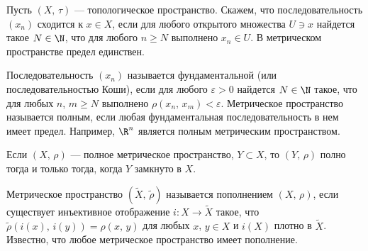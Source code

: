 \documentclass[a4paper
]{article}
\begin{document}
Пусть $(X, \, \tau)$ --- топологическое пространство. Скажем, что
последовательность $(x_n)$ сходится к $x\in X$, если для любого
открытого множества $U\ni x$ найдется такое $N\in \N$, что для любого
$n\ge N$ выполнено $x_n\in U$. В метрическом пространстве предел
единствен. \par
Последовательность $(x_n)$ называется фундаментальной (или
последовательностью Коши), если для любого $\varepsilon>0$
найдется $N\in \N$ такое, что для любых $n$, $m\ge N$ выполнено
$\rho(x_n, \, x_m)<\varepsilon$. Метрическое пространство называется
полным, если любая фундаментальная последовательность в нем имеет
предел. Например, $\R^n$ является полным метрическим пространством.
\par
Если $(X, \, \rho)$ --- полное метрическое пространство, $Y\subset X$,
то $(Y, \, \rho)$ полно тогда и только тогда, когда $Y$ замкнуто
в $X$. \par
Метрическое пространство $(\tilde X, \, \tilde \rho)$ называется
пополнением $(X, \, \rho)$, если существует инъективное отображение
$i:X\rightarrow \tilde X$ такое, что $\tilde \rho(i(x), \, i(y))=
\rho(x, \, y)$ для любых $x$, $y\in X$ и $i(X)$ плотно в $\tilde X$.
Известно, что любое метрическое пространство имеет пополнение.
\end{document}
